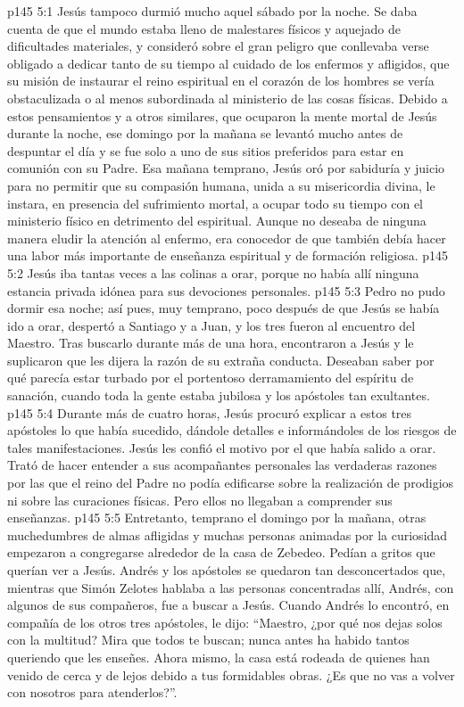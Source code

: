 \vs p145 5:1 Jesús tampoco durmió mucho aquel sábado por la noche. Se daba cuenta de que el mundo estaba lleno de malestares físicos y aquejado de dificultades materiales, y consideró sobre el gran peligro que conllevaba verse obligado a dedicar tanto de su tiempo al cuidado de los enfermos y afligidos, que su misión de instaurar el reino espiritual en el corazón de los hombres se vería obstaculizada o al menos subordinada al ministerio de las cosas físicas. Debido a estos pensamientos y a otros similares, que ocuparon la mente mortal de Jesús durante la noche, ese domingo por la mañana se levantó mucho antes de despuntar el día y se fue solo a uno de sus sitios preferidos para estar en comunión con su Padre. Esa mañana temprano, Jesús oró por sabiduría y juicio para no permitir que su compasión humana, unida a su misericordia divina, le instara, en presencia del sufrimiento mortal, a ocupar todo su tiempo con el ministerio físico en detrimento del espiritual. Aunque no deseaba de ninguna manera eludir la atención al enfermo, era conocedor de que también debía hacer una labor más importante de enseñanza espiritual y de formación religiosa.
\vs p145 5:2 Jesús iba tantas veces a las colinas a orar, porque no había allí ninguna estancia privada idónea para sus devociones personales.
\vs p145 5:3 Pedro no pudo dormir esa noche; así pues, muy temprano, poco después de que Jesús se había ido a orar, despertó a Santiago y a Juan, y los tres fueron al encuentro del Maestro. Tras buscarlo durante más de una hora, encontraron a Jesús y le suplicaron que les dijera la razón de su extraña conducta. Deseaban saber por qué parecía estar turbado por el portentoso derramamiento del espíritu de sanación, cuando toda la gente estaba jubilosa y los apóstoles tan exultantes.
\vs p145 5:4 Durante más de cuatro horas, Jesús procuró explicar a estos tres apóstoles lo que había sucedido, dándole detalles e informándoles de los riesgos de tales manifestaciones. Jesús les confió el motivo por el que había salido a orar. Trató de hacer entender a sus acompañantes personales las verdaderas razones por las que el reino del Padre no podía edificarse sobre la realización de prodigios ni sobre las curaciones físicas. Pero ellos no llegaban a comprender sus enseñanzas.
\vs p145 5:5 Entretanto, temprano el domingo por la mañana, otras muchedumbres de almas afligidas y muchas personas animadas por la curiosidad empezaron a congregarse alrededor de la casa de Zebedeo. Pedían a gritos que querían ver a Jesús. Andrés y los apóstoles se quedaron tan desconcertados que, mientras que Simón Zelotes hablaba a las personas concentradas allí, Andrés, con algunos de sus compañeros, fue a buscar a Jesús. Cuando Andrés lo encontró, en compañía de los otros tres apóstoles, le dijo: “Maestro, ¿por qué nos dejas solos con la multitud? Mira que todos te buscan; nunca antes ha habido tantos queriendo que les enseñes. Ahora mismo, la casa está rodeada de quienes han venido de cerca y de lejos debido a tus formidables obras. ¿Es que no vas a volver con nosotros para atenderlos?”.
